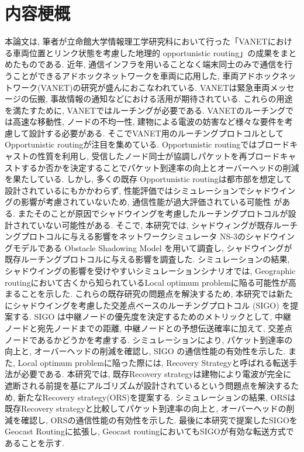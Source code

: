 \documentclass[10pt]{jreport}
\begin{document}
\maketitle


\renewcommand{\thepage}{\roman{page}}
\setcounter{page}{1}
\chapter*{内容梗概}
本論文は, 筆者が立命館大学情報理工学研究科において行った「VANETにおける車両位置とリンク状態を考慮した地理的
opportunistic routing」の成果をまとめたものである.
近年, 通信インフラを用いることなく端末同士のみで通信を行うことができるアドホックネットワークを車両に応用した, 車両アドホックネットワーク(VANET)の研究が盛んにおこなわれている. VANETは緊急車両メッセージの伝搬, 事故情報の通知などにおける活用が期待されている. これらの用途を満たすために, VANETではルーチングが必要である. VANETのルーチングでは高速な移動性, ノードの不均一性, 建物による電波の妨害など様々な要件を考慮して設計する必要がある.
そこでVANET用のルーチングプロトコルとしてOpportunistic routingが注目を集めている.
Opportunistic routingではブロードキャストの性質を利用し, 受信したノード同士が協調しパケットを再ブロードキャストするか否かを決定することでパケット到達率の向上とオーバーヘッドの削減を果たしている. 
しかし, 多くの既存 Opportunistic routingは都市部を想定して設計されているにもかかわらず, 性能評価ではシミュレーションでシャドウイングの影響が考慮されていないため, 通信性能が過大評価されている可能性
がある. またそのことが原因でシャドウイングを考慮したルーチングプロトコルが設計されていない可能性がある. 
そこで, 本研究では, シャドウィングが既存ルーチングプロトコルに与える影響をネットワークシミュレータ
NS-3のシャドウイングモデルである Obstacle Shadowing Model を用いて調査し, シャドウイングが既存ルーチングプロトコルに与える影響を調査した. シミュレーションの結果, シャドウイングの影響を受けやすいシミュレーションシナリオでは, Geographic routingにおいて古くから知られているLocal optimum problemに陥る可能性が高まることを示した. 
これらの既存研究の問題点を解決するため, 本研究では新たにシャドウイングを考慮した交差点ベースのルーチングプロトコル (SIGO) を提案する. SIGO は中継ノードの優先度を決定するためのメトリックとして, 中継ノードと宛先ノードまでの距離, 中継ノードとの予想伝送確率に加えて, 交差点ノードであるかどうかを考慮する. シミュレーションにより,
パケット到達率の向上と, オーバーヘッドの削減を確認し, SIGO の通信性能の有効性を示した. 
また, Local optimum problemに陥った際には, Recovery Strategyと呼ばれる転送手法が必要である.
本研究では, 既存Recovery strategyは建物により電波が完全に遮断される前提を基にアルゴリズムが設計されているという問題点を解決するため, 新たなRecovery strategy(ORS)を提案する. 
シミュレーションの結果, ORSは既存Recovery strategyと比較してパケット到達率の向上と, オーバーヘッドの削減を確認し, ORSの通信性能の有効性を示した. 
最後に本研究で提案したSIGOをGeocast Routingに拡張し, Geocast routingにおいてもSIGOが有効な転送方式であることを示す. 
\end{document}
